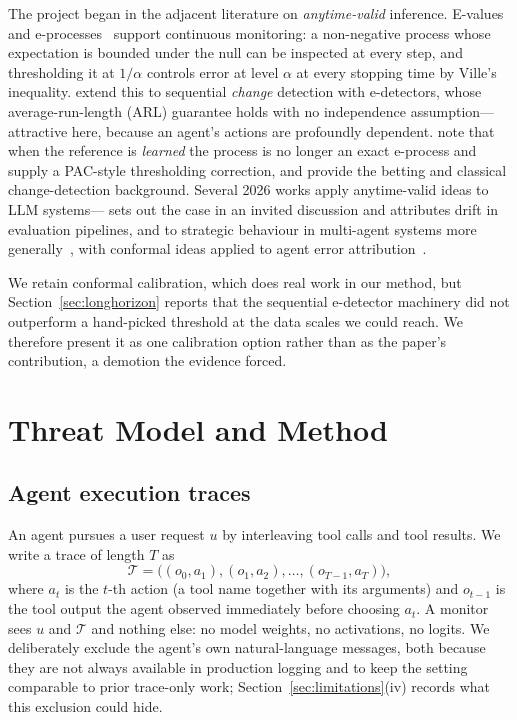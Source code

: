 \documentclass[pdflatex,sn-basic]{sn-jnl}%
\theoremstyle{thmstyleone}
\theoremstyle{thmstyletwo}
\theoremstyle{thmstylethree}
\newcommand{\Tcal}{\mathcal{T}}
\begin{document}
The project began in the adjacent literature on \emph{anytime-valid} inference.
E-values and e-processes~\citep{vovk2021evalues,ramdas2023gametheoretic,
grunwald2024safetesting} support continuous monitoring: a non-negative process
whose expectation is bounded under the null can be inspected at every step, and
thresholding it at $1/\alpha$ controls error at level $\alpha$ at every stopping
time by Ville's inequality. \citet{shin2023edetectors} extend this to sequential
\emph{change} detection with e-detectors, whose average-run-length (ARL) guarantee
holds with no independence assumption---attractive here, because an agent's
actions are profoundly dependent. \citet{sadhuka2025evaluator} note that when the
reference is \emph{learned} the process is no longer an exact e-process and supply
a PAC-style thresholding correction, and
\citet{waudbysmith2023betting,page1954cusum,lorden1971procedures} provide the
betting and classical change-detection background.
Several 2026 works apply anytime-valid ideas to LLM
systems---\citet{xie2026sequential} sets out the case in an invited discussion
and \citet{li2026whodrifted} attributes drift in evaluation pipelines, and to
strategic behaviour in multi-agent systems more
generally~\citep{gauthier2026strategic}, with conformal ideas applied to agent
error attribution~\citep{feng2026conformalattribution}.

We retain conformal calibration, which does real work in our method, but
Section~\ref{sec:longhorizon} reports that the sequential e-detector machinery
did not outperform a hand-picked threshold at the data scales we could
reach. We therefore present it as one calibration option rather than as the
paper's contribution, a demotion the evidence forced.

\section{Threat Model and Method}\label{sec:setup}

\subsection{Agent execution traces}

An agent pursues a user request $u$ by interleaving tool calls and tool results.
We write a trace of length $T$ as
\begin{equation}
\Tcal = \big( (o_0, a_1), (o_1, a_2), \dots, (o_{T-1}, a_T) \big),
\end{equation}
where $a_t$ is the $t$-th action (a tool name together with its arguments) and
$o_{t-1}$ is the tool output the agent observed immediately before choosing
$a_t$. A monitor sees $u$ and $\Tcal$ and nothing else: no model weights, no
activations, no logits. We deliberately exclude the agent's own
natural-language messages, both because they are not always available in
production logging and to keep the setting comparable to prior trace-only
work; Section~\ref{sec:limitations}(iv) records what this exclusion could hide.
\end{document}
